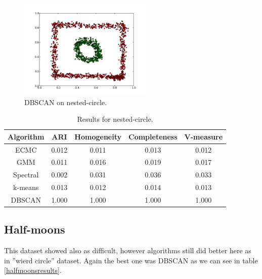 \documentclass[conference]{IEEEtran}
\begin{document}
\begin{figure}[th]
\centering
\includegraphics[width=15pc]{dbscan_circle-weird.pdf}
\caption{DBSCAN on nested-circle.}
\label{DBSCAN_circleweird}
\end{figure}

\begin{table}[htbp]
\caption{Results for nested-circle.}
\label{circleweirdresults}
\begin{center}
\setlength{\tabcolsep}{3pt}
\begin{tabular}{ |c|c|c|c|c| }
\hline
	\bf Algorithm & \bf ARI & \bf Homogeneity & \bf Completeness & \bf V-measure\\ \hline
	
	ECMC & 0.012 & 0.011 & 0.013 & 0.012 \\ \hline
	GMM & 0.011 & 0.016 & 0.019 & 0.017 \\ \hline
	Spectral & 0.002 & 0.031 & 0.036 & 0.033 \\ \hline
	k-means & 0.013 & 0.012 & 0.014 & 0.013 \\ \hline
	DBSCAN & 1.000 & 1.000 & 1.000 & 1.000 \\ \hline
\end{tabular}
\end{center}
\end{table}


\subsection{Half-moons}

This dataset showed also as difficult, however algorithms still did better here as in ''wierd circle'' dataset. Again
the best one was DBSCAN as we can see in table \ref{halfmoonsresults}. 
\end{document}
